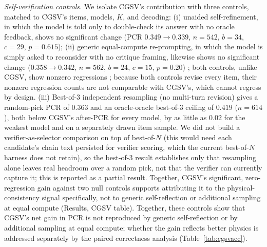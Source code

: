 \documentclass[pdflatex,sn-nature]{sn-jnl}
\newcommand{\rev}[1]{#1} %
\newcommand{\rev}[1]{{\color{blue}#1}} %
\providecommand{\DIFadd}[1]{{\protect\color{blue} \sf #1}} %
\providecommand{\DIFdel}[1]{{\protect\color{red} \scriptsize #1}} %
\providecommand{\DIFaddbegin}{} %
\providecommand{\DIFaddend}{} %
\providecommand{\DIFdelbegin}{} %
\providecommand{\DIFdelend}{} %
\providecommand{\DIFscaledelfig}{0.5}
\newlength{\DIFdelgraphicswidth} %
\newlength{\DIFdelgraphicsheight} %
\providecommand{\DIFaddincludegraphics}[2][]{{\color{blue}\fbox{\DIFOincludegraphics[#1]{#2}}}} %
\providecommand{\DIFdelincludegraphics}[2][]{%
\sbox{\DIFdelgraphicsbox}{\DIFOincludegraphics[#1]{#2}}%
\settoboxwidth{\DIFdelgraphicswidth}{\DIFdelgraphicsbox} %
\settoboxtotalheight{\DIFdelgraphicsheight}{\DIFdelgraphicsbox} %
\scalebox{\DIFscaledelfig}{%
\parbox[b]{\DIFdelgraphicswidth}{\usebox{\DIFdelgraphicsbox}\\[-\baselineskip] \rule{\DIFdelgraphicswidth}{0em}}\llap{\resizebox{\DIFdelgraphicswidth}{\DIFdelgraphicsheight}{%
\setlength{\unitlength}{\DIFdelgraphicswidth}%
\begin{picture}(1,1)%
\thicklines\linethickness{2pt} %
{\color[rgb]{1,0,0}\put(0,0){\framebox(1,1){}}}%
{\color[rgb]{1,0,0}\put(0,0){\line( 1,1){1}}}%
{\color[rgb]{1,0,0}\put(0,1){\line(1,-1){1}}}%
\end{picture}%
}\hspace*{3pt}}} %
} %
\DeclareRobustCommand{\DIFaddbegin}{\DIFOaddbegin \let\includegraphics\DIFaddincludegraphics} %
\DeclareRobustCommand{\DIFaddend}{\DIFOaddend \let\includegraphics\DIFOincludegraphics} %
\DeclareRobustCommand{\DIFdelbegin}{\DIFOdelbegin \let\includegraphics\DIFdelincludegraphics} %
\DeclareRobustCommand{\DIFdelend}{\DIFOaddend \let\includegraphics\DIFOincludegraphics} %
\begin{document}
\noindent\emph{Self-verification controls.} We isolate CGSV's contribution with three
controls, matched to CGSV's items, models, $K$, and decoding: (i) unaided
self-refinement, in which the model is told only to double-check its answer with no oracle
feedback, shows no significant change (PCR $0.349\to0.339$, $n=542$, $b=34$, $c=29$,
$p=0.615$); (ii) generic equal-compute re-prompting, in which the model is simply asked to
reconsider with no critique framing, likewise shows no significant change
($0.358\to0.342$, $n=562$, $b=24$, $c=15$, $p=0.20$)\DIFdelbegin \DIFdel{; both controls, unlike CGSV, show
nonzero regressions}\DIFdelend \DIFaddbegin \DIFadd{\rev{; because both controls revise every item, their
nonzero regression counts are not comparable with CGSV's, which cannot regress by design}}\DIFaddend . (iii) Best-of-3 independent resampling (no multi-turn revision) gives a
random-pick PCR of $0.363$ and an oracle-oracle best-of-3 ceiling of $0.419$ ($n=614$),
both below CGSV's after-PCR for every model, by as little as $0.02$ for the weakest model
and on a separately drawn item sample. We did not build a verifier-as-selector
comparison on top of best-of-$N$ (this would need each candidate's chain text persisted for
verifier scoring, which the current best-of-$N$ harness does not retain), so the
best-of-3 result establishes only that resampling alone leaves real headroom over a random
pick, not that the verifier can currently capture it; this is reported as a partial result. \DIFdelbegin \DIFdel{Together, CGSV's significant, zero-regression gain
against two null controls supports attributing it to the physical-consistency signal
specifically, not to generic self-reflection or additional sampling at equal compute
(Results, CGSV table).
}\DIFdelend \DIFaddbegin \DIFadd{\rev{Together,
these controls show that CGSV's net gain in PCR is not reproduced by generic self-reflection or by
additional sampling at equal compute; whether the gain reflects better physics is addressed separately
by the paired correctness analysis (Table~\ref{tab:cgsvacc}).}
}\DIFaddend 
\end{document}
